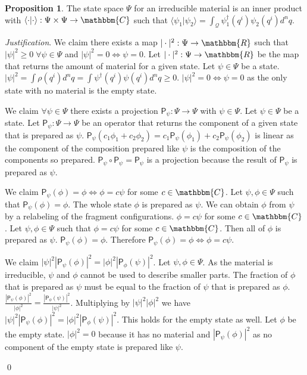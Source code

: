 \documentclass[aps,pra,10pt,twocolumn,floatfix,nofootinbib]{revtex4-1}
\numberwithin{equation}{section}
\theoremstyle{definition}
\newtheorem{prop}[equation]{Proposition}
\newenvironment{justification}{\emph{Justification}.}{\qed}
\begin{document}
\begin{prop}\label{prop:inner_product}
	The state space $\Psi$ for an irreducible material is an inner product with $\langle \cdot |\cdot \rangle : \Psi \times \Psi \rightarrow \mathbbm{C}$ such that $\langle \psi_1 | \psi_2 \rangle = \int_\mathcal{Q} \psi_1^\dagger (q^i) \psi_2(q^i) d^nq$.
\end{prop}
\begin{justification}
	We claim there exists a map $| \cdot | ^2 : \Psi \rightarrow \mathbbm{R}$ such that $|\psi|^2 \ge 0 \; \forall \psi \in \Psi$ and $|\psi|^2 = 0 \Leftrightarrow \psi = 0$. Let $| \cdot | ^2 : \Psi \rightarrow \mathbbm{R}$ be the map that returns the amount of material for a given state. Let $\psi \in \Psi$ be a state. $|\psi|^2 = \int \rho(q^i) d^nq = \int \psi^\dagger(q^i) \psi(q^i) d^nq \ge 0$. $|\psi|^2 = 0 \Leftrightarrow \psi = 0$ as the only state with no material is the empty state.
	
	We claim $\forall \psi \in \Psi$ there exists a projection $\mathsf{P}_\psi : \Psi \rightarrow \Psi$ with $\psi \in \Psi$. Let $\psi \in \Psi$ be a state. Let $\mathsf{P}_\psi : \Psi \rightarrow \Psi$ be an operator that returns the component of a given state that is prepared as $\psi$. $\mathsf{P}_{\psi}(c_1 \phi_1 + c_2 \phi_2) = c_1 \mathsf{P}_{\psi}(\phi_1) + c_2 \mathsf{P}_{\psi}(\phi_2)$ is linear as the component of the composition prepared like $\psi$ is the composition of the components so prepared. $\mathsf{P}_\psi \circ \mathsf{P}_\psi = \mathsf{P}_\psi$ is a projection because the result of $\mathsf{P}_\psi$  is prepared as $\psi$. 
	
	We claim $\mathsf{P}_{\psi} (\phi) = \phi \Leftrightarrow \phi = c \psi$ for some $c \in \mathbbm{C}$. Let $\psi, \phi \in \Psi$ such that $\mathsf{P}_{\psi} (\phi) = \phi$. The whole state $\phi$ is prepared as $\psi$. We can obtain $\phi$ from $\psi$ by a relabeling of the fragment configurations. $\phi = c \psi$ for some $c \in \mathbbm{C}$. Let $\psi, \phi \in \Psi$ such that $\phi = c \psi$ for some $c \in \mathbbm{C}$. Then all of $\phi$ is prepared as $\psi$. $\mathsf{P}_{\psi} (\phi) = \phi$. Therefore $\mathsf{P}_{\psi} (\phi) = \phi \Leftrightarrow \phi = c \psi$.
	
	We claim $|\psi|^2|\mathsf{P}_{\psi} (\phi)|^2=|\phi|^2|\mathsf{P}_{\phi} (\psi)|^2$. Let $\psi, \phi \in \Psi$. As the material is irreducible, $\psi$ and $\phi$ cannot be used to describe smaller parts. The fraction of $\phi$ that is prepared as $\psi$ must be equal to the fraction of $\psi$ that is prepared as $\phi$. $\frac{|\mathsf{P}_{\psi} (\phi)|^2}{|\phi|^2}=\frac{|\mathsf{P}_{\phi} (\psi)|^2}{|\psi|^2}$. Multiplying by $|\psi|^2|\phi|^2$ we have $|\psi|^2|\mathsf{P}_{\psi} (\phi)|^2=|\phi|^2|\mathsf{P}_{\phi} (\psi)|^2$. This holds for the empty state as well. Let $\phi$ be the empty state. $|\phi|^2=0$ because it has no material and $|\mathsf{P}_{\psi} (\phi)|^2$ as no component of the empty state is prepared like $\psi$.
	

\end{justification}
\end{document}
